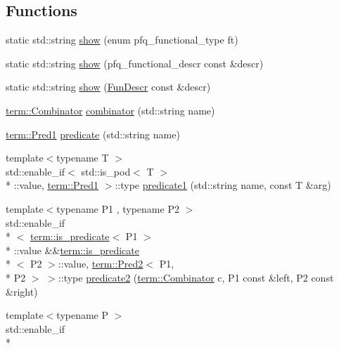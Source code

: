\subsection*{Functions}
\begin{DoxyCompactItemize}
\item 
static std\-::string \hyperlink{namespacepfq__lang_a8fd413aae51832e7fc7f727dae11129c}{show} (enum pfq\-\_\-functional\-\_\-type ft)
\item 
static std\-::string \hyperlink{namespacepfq__lang_a1a60cc110a7a44a7d94775d5d6b1692d}{show} (pfq\-\_\-functional\-\_\-descr const \&descr)
\item 
static std\-::string \hyperlink{namespacepfq__lang_a35c9e73911d862b90ecfeb32fbfcfc8f}{show} (\hyperlink{structpfq__lang_1_1FunDescr}{Fun\-Descr} const \&descr)
\item 
\hyperlink{structpfq__lang_1_1term_1_1Combinator}{term\-::\-Combinator} \hyperlink{namespacepfq__lang_a35f3de0a6684c64d0465aa3f263fa8a6}{combinator} (std\-::string name)
\item 
\hyperlink{structpfq__lang_1_1term_1_1Pred1}{term\-::\-Pred1} \hyperlink{namespacepfq__lang_abd58b2244ff8b0775a3b5865bc128872}{predicate} (std\-::string name)
\item 
{\footnotesize template$<$typename T $>$ }\\std\-::enable\-\_\-if$<$ std\-::is\-\_\-pod$<$ T $>$\\*
\-::value, \hyperlink{structpfq__lang_1_1term_1_1Pred1}{term\-::\-Pred1} $>$\-::type \hyperlink{namespacepfq__lang_ae23a03cee94b5ddfde4a8d2e5c521f0e}{predicate1} (std\-::string name, const T \&arg)
\item 
{\footnotesize template$<$typename P1 , typename P2 $>$ }\\std\-::enable\-\_\-if\\*
$<$ \hyperlink{structpfq__lang_1_1term_1_1is__predicate}{term\-::is\-\_\-predicate}$<$ P1 $>$\\*
\-::value \&\&\hyperlink{structpfq__lang_1_1term_1_1is__predicate}{term\-::is\-\_\-predicate}\\*
$<$ P2 $>$\-::value, \hyperlink{structpfq__lang_1_1term_1_1Pred2}{term\-::\-Pred2}$<$ P1, \\*
P2 $>$ $>$\-::type \hyperlink{namespacepfq__lang_a89ea436faf8b7f13512e07efbce83b41}{predicate2} (\hyperlink{structpfq__lang_1_1term_1_1Combinator}{term\-::\-Combinator} c, P1 const \&left, P2 const \&right)
\item 
{\footnotesize template$<$typename P $>$ }\\std\-::enable\-\_\-if\\*

\end{DoxyCompactItemize}

